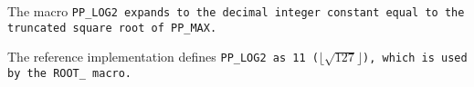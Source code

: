 The macro \tt{PP_LOG2} expands to the decimal integer constant
equal to the truncated square root of \tt{PP_MAX}.

\note The reference implementation defines \tt{PP_LOG2} as 11
($\lfloor\sqrt{127}\rfloor$), which is used by the \tt{ROOT_} macro.
